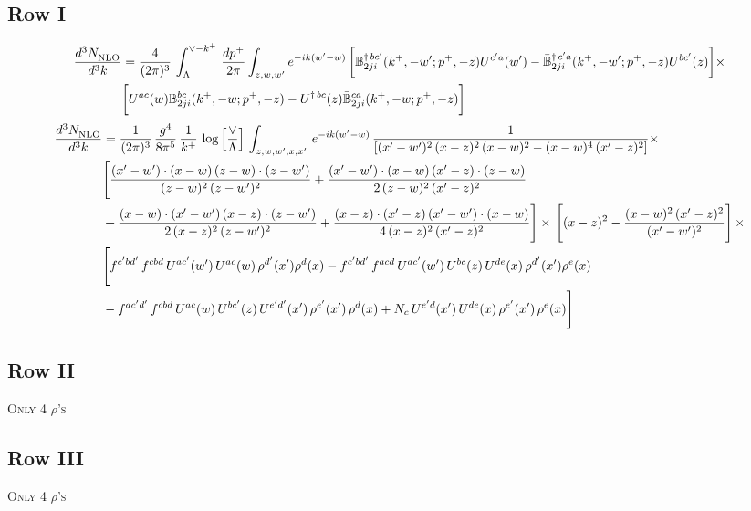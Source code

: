 \documentclass[9pt]{article}
\def\mf#1{\mathbb{#1}}
\numberwithin{equation}{section}
\begin{document}
\subsection{{\color{green}Row I}}
\begin{align}
    \frac{d^{3}N_{\rm NLO}^{\rm}}{d^{3}k}  & = \frac{4}{(2\pi)^{3}}\,\int_{\Lambda}^{\vee-k^{+}}\, \frac{dp^{+}}{2\pi}\int_{z,w,w^{\prime}} e^{-ik(w^{\prime}-w)}\, \bigg[\mf{B}^{\dagger\, bc^{\prime}}_{2ji}(k^{+},-w^{\prime};p^{+},-z)U^{ c^{\prime}a}(w^{\prime}) -\Bar{\mf{B}}^{\dagger\, c^{\prime}a}_{2ji}(k^{+},-w^{\prime}; p^{+},-z)U^{bc^{\prime}}(z)\bigg]\times\notag \\ & \bigg[U^{ac}(w) \mf{B}^{bc}_{2ji}(k^{+},-w;p^{+},-z) -U^{\dagger\, bc}(z)\Bar{\mf{B}}^{ca}_{2ji}(k^{+},-w; p^{+},-z)\bigg]\nonumber
\end{align}
\begin{align}
 \frac{d^{3}N_{\rm NLO}^{\rm}}{d^{3}k}  & =     \frac{1}{(2\pi)^{3}}\, \frac{g^{4}}{8\pi^{5}}\,\frac{1}{k^{+}}\,\log{\left[\frac{\vee}{\Lambda}\right]}\,\int_{z,w,w^{\prime},x,x'}\, e^{-ik(w^{\prime}-w)}\, \frac{1}{\left[(x'-w')^{2}\,(x-z)^{2}\,(x-w)^{2} - (x-w)^{4}\, (x'-z)^{2}\right]} \times\notag \\ & \Bigg[\frac{(x'-w')\cdot (x-w)\, (z-w)\cdot (z-w')}{(z-w)^{2}\, (z-w')^{2}}+\frac{(x'-w')\cdot (x-w)\, (x'-z)\cdot (z-w)}{2\, (z-w)^{2}\, (x'-z)^{2}}\notag \\ & +\frac{(x-w)\cdot (x'-w')\, (x-z)\cdot (z-w')}{2\, (x-z)^{2}\, (z-w')^{2}}+\frac{(x-z)\cdot (x'-z)\, (x'-w')\cdot (x-w)}{4\, (x-z)^{2}\, (x'-z)^{2}}\Bigg] \times\,\Bigg[(x-z)^{2} - \frac{(x-w)^{2}\, (x'-z)^{2}}{(x'-w')^{2}}\Bigg]\,\times \notag \\ & \Bigg[f^{c'bd'}\,f^{cbd}\, U^{ac'}(w')\,U^{ac}(w)\,\rho^{d'}(x')\rho^{d}(x)- f^{c'bd'}\,f^{acd}\,U^{ac'}(w')\,U^{bc}(z)\,U^{de}(x)\,\rho^{d'}(x')\rho^{e}(x) \notag \\ & -f^{ac'd'}\,f^{cbd}\,U^{ac}(w)\,U^{bc'}(z)\,U^{e'd'}(x')\,\rho^{e'}(x')\,\rho^{d}(x) +N_{c}\,U^{e'd}(x')\,U^{de}(x)\,\rho^{e'}(x')\,\rho^{e}(x)\Bigg]
\end{align}
\subsection{Row II}
\textsc{Only 4 $\rho$'s}
\subsection{Row III}
\textsc{Only 4 $\rho$'s}
\end{document}
